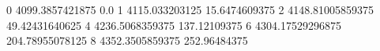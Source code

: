 0 4099.3857421875 0.0
1 4115.033203125 15.6474609375
2 4148.81005859375 49.42431640625
4 4236.5068359375 137.12109375
6 4304.17529296875 204.78955078125
8 4352.3505859375 252.96484375
